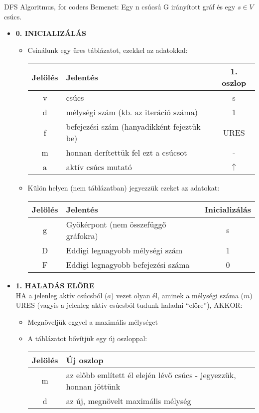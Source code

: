 \begin{tetel}{DFS Algoritmus, for coders}
Bemenet: Egy n csúcsú G irányított gráf és egy $s \in V$ csúcs.
\begin{itemize}
\item{\textbf{0. INICIALIZÁLÁS}}
  \begin{itemize}
  \item Csinálunk egy üres táblázatot, ezekkel az adatokkal:\\
    
    \begin{tabular}{c l c}
      Jelölés & Jelentés & 1. oszlop\\
      \hline
      v & csúcs & s\\
      d & mélységi szám (kb. az iteráció száma) & 1\\
      f & befejezési szám (hanyadikként fejeztük be) & URES\\
      m & honnan derítettük fel ezt a csúcsot & -\\
      a & aktív csúcs mutató & $\uparrow$\\
    \end{tabular}

  \item Külön helyen (nem táblázatban) jegyezzük ezeket az adatokat:\\
    
    \begin{tabular}{c l c}
      Jelölés & Jelentés & Inicializálás\\
      \hline
      g & Gyökérpont (nem összefüggő gráfokra) & s\\
      D & Eddigi legnagyobb mélységi szám& 1\\
      F & Eddigi legnagyobb befejezési száma& 0\\
    \end{tabular}
  \end{itemize}
\item{\textbf{1. HALADÁS ELŐRE}}
  \\
  HA a jelenleg aktív csúcsból ($a$) vezet olyan él, aminek a mélységi száma ($m$) URES (vagyis a jelenleg aktív csúcsból tudunk haladni ``előre''), AKKOR:
  \begin{itemize}
  \item Megnöveljük eggyel a maximális mélységet
  \item A táblázatot bővítjük egy új oszloppal:\\

    \begin{tabular}{c l}
      Jelölés & Új oszlop\\
      \hline
      m & az előbb említett él elején lévő csúcs - jegyezzük, honnan jöttünk\\
      d & az új, megnövelt maximális mélység\\
    \end{tabular}


\end{itemize}
\end{itemize}
\end{tetel}
